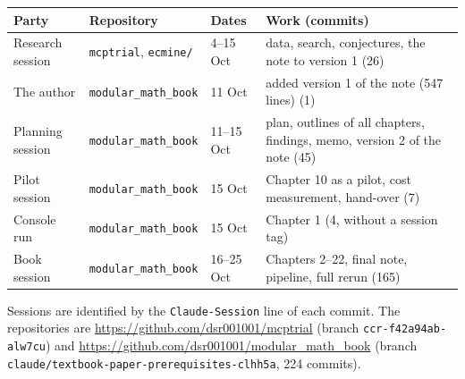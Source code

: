 \documentclass[11pt,a4paper]{article}
\begin{document}
\begin{center}\small
\begin{tabularx}{\textwidth}{@{}lllX@{}}
\toprule
Party & Repository & Dates & Work (commits)\\
\midrule
Research session & \texttt{mcptrial}, \texttt{ecmine/} & 4--15 Oct & data, search, conjectures, the note to version 1 (26)\\
The author & \texttt{modular\_math\_book} & 11 Oct & added version 1 of the note (547 lines) (1)\\
Planning session & \texttt{modular\_math\_book} & 11--15 Oct & plan, outlines of all chapters, findings, memo, version 2 of the note (45)\\
Pilot session & \texttt{modular\_math\_book} & 15 Oct & Chapter 10 as a pilot, cost measurement, hand-over (7)\\
Console run & \texttt{modular\_math\_book} & 15 Oct & Chapter 1 (4, without a session tag)\\
Book session & \texttt{modular\_math\_book} & 16--25 Oct & Chapters 2--22, final note, pipeline, full rerun (165)\\
\bottomrule
\end{tabularx}
\end{center}
Sessions are identified by the \texttt{Claude-Session} line of each commit. The repositories are \url{https://github.com/dsr001001/mcptrial} (branch \texttt{ccr-f42a94ab-alw7cu}) and \url{https://github.com/dsr001001/modular_math_book} (branch \texttt{claude/textbook-paper-prerequisites-clhh5a}, 224 commits).
\end{document}
